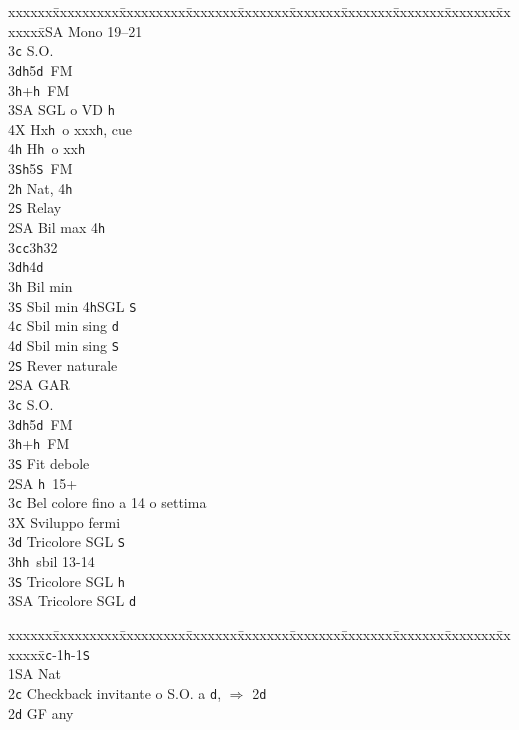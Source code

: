 \documentclass[a4paper,italian]{article}
\newcommand{\BS}{\small{\texttt{S}}}
\newcommand{\BC}{\small{\texttt{c}}}
\newcommand{\BD}{\small{\texttt{d}}}
\newcommand{\BH}{\small{\texttt{h}}}
\newenvironment{bidtable}
{\begin{tabbing}

    xxxxxx\=xxxxxxxxx\=xxxxxxxxx\=xxxxxxx\=xxxxxxx\=xxxxxxx\=xxxxxxx\=xxxxxxx\=xxxxxxx\=xxxxxxx\=\kill}
{\end{tabbing} }%
\begin{document}
\begin{multicols}{2}
\begin{bidtable}
        3\small{SA} \> Mono 19--21\-\\
        3\BC \> S.O.\\
        3\BD {}\BH 5\BD\ FM\\
        3\BH {}+\BH\ FM\+\\
        3\small{SA} \> SGL o VD \BH\\
        4X \> Hx\BH\ o xxx\BH, cue\\
        4\BH \> H\BH\ o xx\BH\-\\
        3\BS {}\BH 5\BS\ FM\-\\
        2\BH \> Nat, 4\BH \+\\
        2\BS \> Relay\+\\
        2\small{SA} \> Bil max 4\BH\\
        3\BC {}\BC 3\BH 32\\
        3\BD {}\BH4\BD\+\\
        3\BH \> Bil min\\
        3\BS \> Sbil min 4\BH SGL \BS\\
        4\BC \> Sbil min sing \BD \\
        4\BD \> Sbil min sing \BS \-\-\\
        2\BS \> Rever naturale\+\\
        2\small{SA} \> GAR\\
        3\BC \> S.O.\\
        3\BD {}\BH 5\BD\ FM\\
        3\BH {}+\BH\ FM\\
        3\BS \> Fit debole\-\\
        2\small{SA} \BH\ 15+\\
        3\BC \> Bel colore fino a 14 o settima\+\\
        3X \> Sviluppo fermi\-\\
        3\BD \> Tricolore SGL \BS \\
        3\BH {}\BH\ sbil 13-14\\
        3\BS \> Tricolore SGL \BH \\
        3\small{SA} \> Tricolore SGL \BD \-
    \end{bidtable}
    \bigbreak
    \begin{bidtable}
        1\BC-1\BH-1\BS\+\\
        1\small{SA} \> Nat\\
        2\BC \> Checkback invitante o S.O. a \BD , $\Rightarrow$ 2\BD \\
        2\BD \> GF any\+\\

\end{bidtable}
\end{multicols}
\end{document}
